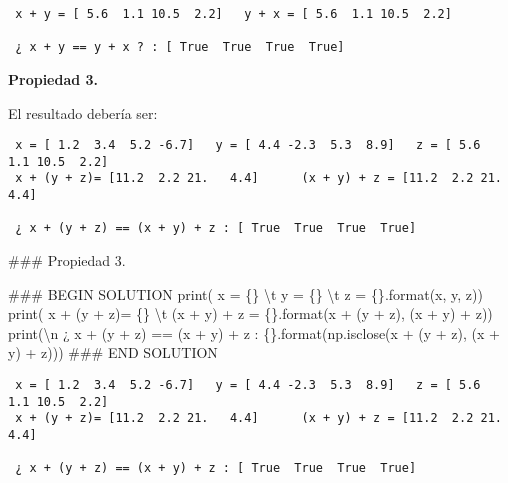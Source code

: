 \documentclass[
  letterpaper,
  DIV=11,
  numbers=noendperiod]{scrreprt}
\newenvironment{Shaded}{\begin{snugshade}}{\end{snugshade}}
\newcommand{\BuiltInTok}[1]{\textcolor[rgb]{0.00,0.23,0.31}{#1}}
\newcommand{\CharTok}[1]{\textcolor[rgb]{0.13,0.47,0.30}{#1}}
\newcommand{\CommentTok}[1]{\textcolor[rgb]{0.37,0.37,0.37}{#1}}
\newcommand{\NormalTok}[1]{\textcolor[rgb]{0.00,0.23,0.31}{#1}}
\newcommand{\OperatorTok}[1]{\textcolor[rgb]{0.37,0.37,0.37}{#1}}
\newcommand{\RegionMarkerTok}[1]{\textcolor[rgb]{0.00,0.23,0.31}{#1}}
\newcommand{\SpecialCharTok}[1]{\textcolor[rgb]{0.37,0.37,0.37}{#1}}
\newcommand{\StringTok}[1]{\textcolor[rgb]{0.13,0.47,0.30}{#1}}
\begin{document}
\begin{verbatim}
 x + y = [ 5.6  1.1 10.5  2.2]   y + x = [ 5.6  1.1 10.5  2.2]

 ¿ x + y == y + x ? : [ True  True  True  True]
\end{verbatim}

\textbf{Propiedad 3.}

El resultado debería ser:

\begin{verbatim}
 x = [ 1.2  3.4  5.2 -6.7]   y = [ 4.4 -2.3  5.3  8.9]   z = [ 5.6  1.1 10.5  2.2]
 x + (y + z)= [11.2  2.2 21.   4.4]      (x + y) + z = [11.2  2.2 21.   4.4]

 ¿ x + (y + z) == (x + y) + z : [ True  True  True  True]
\end{verbatim}

\begin{Shaded}
\begin{Highlighting}[]
\CommentTok{\#\#\# Propiedad 3.}

\CommentTok{\#\#\# }\RegionMarkerTok{BEGIN}\CommentTok{ SOLUTION}
\BuiltInTok{print}\NormalTok{(}\StringTok{\textquotesingle{} x = }\SpecialCharTok{\{\}}\StringTok{ }\CharTok{\textbackslash{}t}\StringTok{ y = }\SpecialCharTok{\{\}}\StringTok{ }\CharTok{\textbackslash{}t}\StringTok{ z = }\SpecialCharTok{\{\}}\StringTok{\textquotesingle{}}\NormalTok{.}\BuiltInTok{format}\NormalTok{(x, y, z))}
\BuiltInTok{print}\NormalTok{(}\StringTok{\textquotesingle{} x + (y + z)= }\SpecialCharTok{\{\}}\StringTok{ }\CharTok{\textbackslash{}t}\StringTok{ (x + y) + z = }\SpecialCharTok{\{\}}\StringTok{\textquotesingle{}}\NormalTok{.}\BuiltInTok{format}\NormalTok{(x }\OperatorTok{+}\NormalTok{ (y }\OperatorTok{+}\NormalTok{ z), (x }\OperatorTok{+}\NormalTok{ y) }\OperatorTok{+}\NormalTok{ z))}
\BuiltInTok{print}\NormalTok{(}\StringTok{\textquotesingle{}}\CharTok{\textbackslash{}n}\StringTok{ ¿ x + (y + z) == (x + y) + z : }\SpecialCharTok{\{\}}\StringTok{\textquotesingle{}}\NormalTok{.}\BuiltInTok{format}\NormalTok{(np.isclose(x }\OperatorTok{+}\NormalTok{ (y }\OperatorTok{+}\NormalTok{ z), (x }\OperatorTok{+}\NormalTok{ y) }\OperatorTok{+}\NormalTok{ z)))}
\CommentTok{\#\#\# }\RegionMarkerTok{END}\CommentTok{ SOLUTION}
\end{Highlighting}
\end{Shaded}

\begin{verbatim}
 x = [ 1.2  3.4  5.2 -6.7]   y = [ 4.4 -2.3  5.3  8.9]   z = [ 5.6  1.1 10.5  2.2]
 x + (y + z)= [11.2  2.2 21.   4.4]      (x + y) + z = [11.2  2.2 21.   4.4]

 ¿ x + (y + z) == (x + y) + z : [ True  True  True  True]
\end{verbatim}
\end{document}
